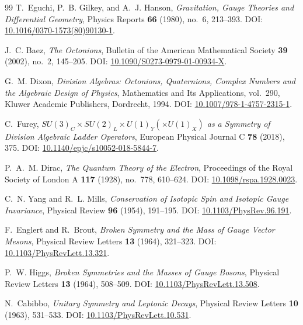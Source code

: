 \begin{thebibliography}{99}
T.~Eguchi, P.~B. Gilkey, and A.~J. Hanson,
\emph{Gravitation, Gauge Theories and Differential Geometry},
Physics Reports \textbf{66} (1980), no.~6, 213--393.
\newblock DOI: \href{https://doi.org/10.1016/0370-1573(80)90130-1}{10.1016/0370-1573(80)90130-1}.

J.~C. Baez,
\emph{The Octonions},
Bulletin of the American Mathematical Society \textbf{39} (2002), no.~2, 145--205.
\newblock DOI: \href{https://doi.org/10.1090/S0273-0979-01-00934-X}{10.1090/S0273-0979-01-00934-X}.

G.~M. Dixon,
\emph{Division Algebras: Octonions, Quaternions, Complex Numbers and the Algebraic Design of Physics},
Mathematics and Its Applications, vol.~290,
Kluwer Academic Publishers, Dordrecht, 1994.
\newblock DOI: \href{https://doi.org/10.1007/978-1-4757-2315-1}{10.1007/978-1-4757-2315-1}.

C.~Furey,
\emph{$SU(3)_C\times SU(2)_L\times U(1)_Y\left(\times U(1)_X\right)$ as a Symmetry of Division Algebraic Ladder Operators},
European Physical Journal C \textbf{78} (2018), 375.
\newblock DOI: \href{https://doi.org/10.1140/epjc/s10052-018-5844-7}{10.1140/epjc/s10052-018-5844-7}.

P.~A.~M. Dirac,
\emph{The Quantum Theory of the Electron},
Proceedings of the Royal Society of London A \textbf{117} (1928), no.~778, 610--624.
\newblock DOI: \href{https://doi.org/10.1098/rspa.1928.0023}{10.1098/rspa.1928.0023}.

C.~N. Yang and R.~L. Mills,
\emph{Conservation of Isotopic Spin and Isotopic Gauge Invariance},
Physical Review \textbf{96} (1954), 191--195.
\newblock DOI: \href{https://doi.org/10.1103/PhysRev.96.191}{10.1103/PhysRev.96.191}.

F.~Englert and R.~Brout,
\emph{Broken Symmetry and the Mass of Gauge Vector Mesons},
Physical Review Letters \textbf{13} (1964), 321--323.
\newblock DOI: \href{https://doi.org/10.1103/PhysRevLett.13.321}{10.1103/PhysRevLett.13.321}.

P.~W. Higgs,
\emph{Broken Symmetries and the Masses of Gauge Bosons},
Physical Review Letters \textbf{13} (1964), 508--509.
\newblock DOI: \href{https://doi.org/10.1103/PhysRevLett.13.508}{10.1103/PhysRevLett.13.508}.

N.~Cabibbo,
\emph{Unitary Symmetry and Leptonic Decays},
Physical Review Letters \textbf{10} (1963), 531--533.
\newblock DOI: \href{https://doi.org/10.1103/PhysRevLett.10.531}{10.1103/PhysRevLett.10.531}.


\end{thebibliography}
